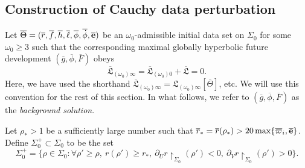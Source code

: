 \documentclass[10pt, reqno]{amsart}
\theoremstyle{definition}
\theoremstyle{remark}
\theoremstyle{conjecture}
\numberwithin{equation}{section}
\newcommand{\set}[1]{\{#1\}}
\newcommand{\rd}{\partial}
\newcommand{\0}{\emptyset}
\newcommand{\Sgm}{\Sigma}
\newcommand{\Tht}{\Theta}
\newcommand{\omg}{\omega}
\newcommand{\bfe}{{\bf e}}
\newcommand{\e}{\bfe}							%
\newcommand{\gbg}{\overline{g}}					%
\newcommand{\Fbg}{\overline{F}}					%
\newcommand{\phibg}{\overline{\phi}}				%
\newcommand{\rbg}{\overline{r}}					%
\newcommand{\varpibg}{\overline{\varpi}}				%
\newcommand{\ebg}{\overline{\e}}					%
\newcommand{\fbg}{\overline{f}}
\newcommand{\hbg}{\overline{h}}
\newcommand{\ellbg}{\overline{\ell}}
\newcommand{\dphibg}{\overline{\dot{\phi}}}
\begin{document}
\subsection{Construction of Cauchy data perturbation} \label{subsec:inst-key}
Let $\overline{\Tht} = (\rbg, \fbg, \hbg, \ellbg, \phibg, \dphibg, \ebg)$ be an $\omg_{0}$-admissible initial data set on $\Sgm_{0}$ for some $\omg_{0} \geq 3$ such that the corresponding maximal globally hyperbolic future development $(\gbg, \phibg, \Fbg)$ obeys
\begin{equation*}
\overline{\mathfrak{L}}_{(\omg_{0}) \infty} = \overline{\mathfrak{L}}_{(\omg_{0}) 0} + \overline{\mathfrak{L}} = 0.
\end{equation*}
Here, we have used the shorthand $\overline{\mathfrak{L}}_{(\omg_{0}) \infty}=\mathfrak{L}_{(\omg_{0}) \infty}[\overline{\Tht}]$, etc. We will use this convention for the rest of this section. In what follows, we refer to $(\gbg, \phibg, \Fbg)$ as the \emph{background solution}.

Let $\rho_*>1$ be a sufficiently large number such that $\rbg_*=\rbg(\rho_*)> 20\max \set{\varpibg_{i}, \ebg}$. Define $\Sgm_{0}^{+}\subset \Sgm_0$ to be the set
\begin{equation*}
\Sgm_{0}^{+} = \set{\rho \in \Sgm_{0} : \forall \rho' \geq \rho, \ r(\rho') \geq r_*, \ \rd_{U} r \restriction_{\Sgm_{0}}(\rho') < 0, \  \rd_{V} r \restriction_{\Sgm_{0}}(\rho') > 0}.
\end{equation*}
\end{document}

